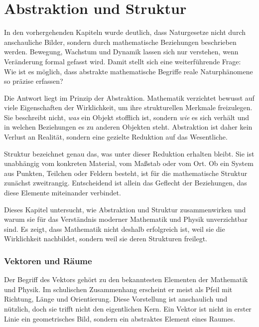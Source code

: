 \chapter{Abstraktion und Struktur}
\label{chap:V_abstraktion}


In den vorhergehenden Kapiteln wurde deutlich,
dass Naturgesetze
nicht durch anschauliche Bilder,
sondern durch mathematische Beziehungen beschrieben werden.
Bewegung,
Wachstum
und Dynamik
lassen sich nur verstehen,
wenn Veränderung
formal gefasst wird.
Damit stellt sich eine weiterführende Frage:
Wie ist es möglich,
dass abstrakte mathematische Begriffe
reale Naturphänomene so präzise erfassen?

Die Antwort liegt im Prinzip der Abstraktion.
Mathematik
verzichtet bewusst auf viele Eigenschaften der Wirklichkeit,
um ihre strukturellen Merkmale freizulegen.
Sie beschreibt nicht,
\emph{was} ein Objekt stofflich ist,
sondern \emph{wie} es sich verhält
und in welchen Beziehungen es zu anderen Objekten steht.
Abstraktion ist daher kein Verlust an Realität,
sondern eine gezielte Reduktion auf das Wesentliche.

Struktur
bezeichnet genau das,
was unter dieser Reduktion erhalten bleibt.
Sie ist unabhängig vom konkreten Material,
vom Maßstab
oder vom Ort.
Ob ein System aus Punkten,
Teilchen
oder Feldern besteht,
ist für die mathematische Struktur zunächst zweitrangig.
Entscheidend ist allein das Geflecht der Beziehungen,
das diese Elemente miteinander verbindet.

Dieses Kapitel untersucht,
wie Abstraktion und Struktur zusammenwirken
und warum sie für das Verständnis moderner Mathematik
und Physik unverzichtbar sind.
Es zeigt,
dass Mathematik nicht deshalb erfolgreich ist,
weil sie die Wirklichkeit nachbildet,
sondern weil sie deren Strukturen freilegt.





\subsection{Vektoren und Räume}

Der Begriff des Vektors
gehört zu den bekanntesten Elementen der Mathematik
und Physik.
Im schulischen Zusammenhang erscheint er meist als Pfeil
mit Richtung, Länge und Orientierung.
Diese Vorstellung ist anschaulich und nützlich,
doch sie trifft nicht den eigentlichen Kern.
Ein Vektor ist nicht in erster Linie ein geometrisches Bild,
sondern ein abstraktes Element eines Raumes.

